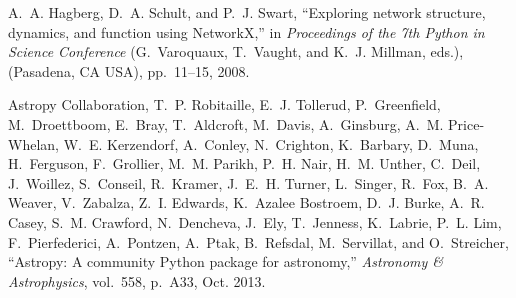 \documentclass[twocolumn]{article}
\begin{document}
\begin{thebibliography}{10}
A.~A. Hagberg, D.~A. Schult, and P.~J. Swart, ``Exploring network structure,
  dynamics, and function using {NetworkX},'' in {\em Proceedings of the 7th
  Python in Science Conference} (G.~Varoquaux, T.~Vaught, and K.~J. Millman,
  eds.), (Pasadena, CA USA), pp.~11--15, 2008.

{Astropy Collaboration}, T.~P. {Robitaille}, E.~J. {Tollerud}, P.~{Greenfield},
  M.~{Droettboom}, E.~{Bray}, T.~{Aldcroft}, M.~{Davis}, A.~{Ginsburg}, A.~M.
  {Price-Whelan}, W.~E. {Kerzendorf}, A.~{Conley}, N.~{Crighton}, K.~{Barbary},
  D.~{Muna}, H.~{Ferguson}, F.~{Grollier}, M.~M. {Parikh}, P.~H. {Nair}, H.~M.
  {Unther}, C.~{Deil}, J.~{Woillez}, S.~{Conseil}, R.~{Kramer}, J.~E.~H.
  {Turner}, L.~{Singer}, R.~{Fox}, B.~A. {Weaver}, V.~{Zabalza}, Z.~I.
  {Edwards}, K.~{Azalee Bostroem}, D.~J. {Burke}, A.~R. {Casey}, S.~M.
  {Crawford}, N.~{Dencheva}, J.~{Ely}, T.~{Jenness}, K.~{Labrie}, P.~L. {Lim},
  F.~{Pierfederici}, A.~{Pontzen}, A.~{Ptak}, B.~{Refsdal}, M.~{Servillat}, and
  O.~{Streicher}, ``{Astropy: A community Python package for astronomy},'' {\em
  Astronomy \& Astrophysics}, vol.~558, p.~A33, Oct. 2013.


\end{thebibliography}
\end{document}
